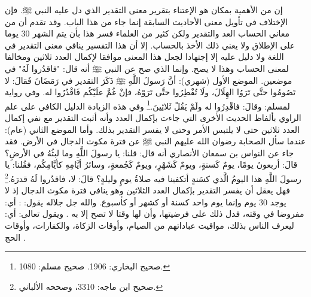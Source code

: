إن من الأهمية بمكان هو الإعتناء بتقرير معنى التقدير الذي دل عليه النبي ﷺ. فإن الإختلاف في تأويل معنى الأحاديث السابقة إنما جاء من هذا الباب. وقد تقدم أن من معاني الحساب العد والتقدير ولكن كثير من العلماء فسر هذا بأن يتم الشهر 30 يوما على الإطلاق ولا يعني ذلك الأخذ بالحساب. إلا أن هذا التفسير ينافي معنى التقدير في اللغة ولا دليل عليه إلا إجتهادا لجعل هذا المعنى موافقا لإكمال العدد ثلاثين ومخالفا لمعنى الحساب وهذا لا يصح. وإنما الذي صح عن النبي ﷺ أنه قال: "فاقدُروا لَهُ" في موضعين. الموضع الأول (شهري): أنَّ رَسولَ اللَّهِ ﷺ ذَكَرَ التقدير في رَمَضَانَ فَقالَ: لا تَصُومُوا حتَّى تَرَوُا الهِلَالَ، ولَا تُفْطِرُوا حتَّى تَرَوْهُ، فإنْ غُمَّ علَيْكُم فَاقْدُرُوا له. وفي رواية لمسلم: وقالَ: فاقْدِرُوا له ولَمْ يَقُلْ ثَلاثِينَ.\footnote{صحيح البخاري: 1906. صحيح مسلم: 1080.} وفي هذه الزيادة الدليل الكافي على علم الراوي بألفاظ الحديث الأخرى التي جاءت بإكمال العدد وأنه أثبت التقدير مع نفي إكمال العدد ثلاثين حتى لا يلتبس الأمر وحتى لا يفسر التقدير بذلك. وأما الموضع الثاني (عام): عندما سأل الصحابة رضوان الله عليهم النبي ﷺ عن فترة مكوث الدجال في الأرض. فقد جاء عن النواس بن سمعان الأنصاري أنه قال: قلنا: يا رسولَ اللَّهِ وما لبثُهُ في الأرضِ؟ قالَ: أربعونَ يومًا، يومٌ كَسنةٍ، ويومٌ كَشَهْرٍ، ويومٌ كَجُمعةٍ، وسائرُ أيَّامِهِ كأيَّامِكُم، فقُلنا: يا رسولَ اللَّهِ هذا اليومُ الَّذي كسَنةٍ أتكفينا فيه صلاةُ يومٍ وليلةٍ؟ قالَ: لا، فاقدُروا لَهُ قدرَهُ.\footnote{صحيح ابن ماجه: 3310، وصححه الألباني.} فهل يعقل أن يفسر التقدير بإكمال العدد الثلاثين وهو ينافي فترة مكوث الدجال إذ لا يوجد 30 يوم وإنما يوم واحد كسنة أو كشهر أو كأسبوع. والله جل جلاله يقول: \quranayah*[4][103][14] {\footnotesize (\surahname*[4])}:  أي: مفروضا في وقته، فدل ذلك على فرضيتها، وأن لها وقتا لا تصح إلا به \cite{tafsir_Saadi}. ويقول تعالى: \quranayah*[2][189][1-8] {\footnotesize (\surahname*[2])} أي: ليعرف الناس بذلك، مواقيت عباداتهم من الصيام، وأوقات الزكاة، والكفارات، وأوقات الحج \cite{tafsir_Saadi}.

